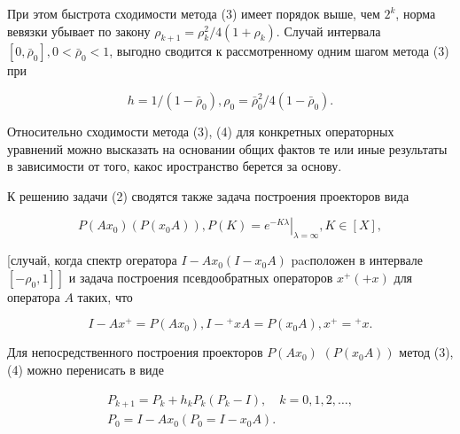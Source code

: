 \documentclass[10pt]{article}
\begin{document}
При этом быстрота сходимости метода (3) имеет порядок выше, чем $2^{k}$, норма вевязки убывает по закону $\rho_{k+1}=\rho_{k}^{2} / 4\left(1+\rho_{k}\right)$. Случай интервала $\left[0, \bar{\rho}_{0}\right], 0<\bar{\rho}_{0}<1$, выгодно сводится к рассмотренному одним шагом метода (3) при



\[

h=1 /\left(1-\bar{\rho}_{0}\right), \rho_{0}=\bar{\rho}_{0}^{2} / 4\left(1-\bar{\rho}_{0}\right) .

\]



Относительно сходимости метода (3), (4) для конкретных операторных уравнений можно высказать на основании общих фактов те или иные результаты в зависимости от того, какос иространство берется за основу.



К решению задачи (2) сводятся также задача построения проекторов вида



\[

P\left(A x_{0}\right)\left(P\left(x_{0} A\right)\right), P(K)=\left.e^{-K \lambda}\right|_{\lambda=\infty}, K \in[X],

\]



[случай, когда спектр огератора $I-A x_{0}\left(I-x_{0} A\right)$ pacположен в интервале $\left.\left[-\rho_{0}, 1\right]\right]$ и задача построения псевдообратных операторов $x^{+}(+x)$ для оператора $A$ таких, что



\[

I-A x^{+}=P\left(A x_{0}\right), I-{ }^{+} x A=P\left(x_{0} A\right), x^{+}={ }^{+} x .

\]



Для непосредственного построения проекторов $P\left(A x_{0}\right)$ $\left(P\left(x_{0} A\right)\right)$ метод (3), (4) можно перенисать в виде



\[

\begin{gathered}

P_{k+1}=P_{k}+h_{k} P_{k}\left(P_{k}-I\right), \quad k=0,1,2, \ldots, \\

P_{0}=I-A x_{0}\left(P_{0}=I-x_{0} A\right) .

\end{gathered}

\]
\end{document}
